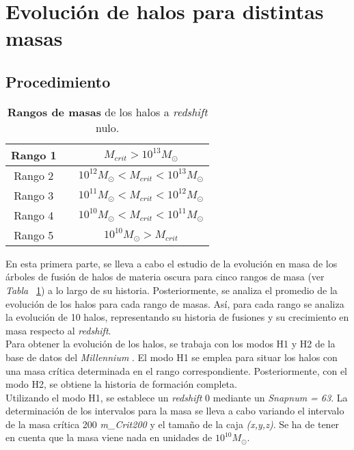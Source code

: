 \section{Evolución de halos para distintas masas} 
\label{sec:2} %

\subsection{Procedimiento}
\label{subsec:2_A}

\begin{table}[H]
\begin{center}
\begin{tabular}{ccc}
\toprule
\cellcolor[gray]{0.9}Rango 1 & & $M_{crit}>10^{13}M_\odot$ \\
\midrule
\cellcolor[gray]{0.9}Rango 2 & & $10^{12}M_\odot<M_{crit}<10^{13}M_\odot$ \\
\midrule
\cellcolor[gray]{0.9}Rango 3 & & $10^{11}M_\odot<M_{crit}<10^{12}M_\odot$ \\
\midrule
\cellcolor[gray]{0.9}Rango 4 & & $10^{10}M_\odot<M_{crit}<10^{11}M_\odot$ \\
\midrule
\cellcolor[gray]{0.9}Rango 5 & & $10^{10}M_\odot>M_{crit}$ \\
\bottomrule
\end{tabular}
\end{center}
\caption{\textbf{Rangos de masas} de los halos a \textit{redshift} nulo.}
\label{tab:tabla2}
\end{table}

En esta primera parte, se lleva a cabo el estudio de la evolución en masa de los árboles de fusión de halos de materia oscura para cinco rangos de masa (ver \textit{Tabla} ~\ref{tab:tabla2}) a lo largo de su historia. Posteriormente, se analiza el promedio de la evolución de los halos para cada rango de masas. Así, para cada rango se analiza la evolución de 10 halos, representando su historia de fusiones y su crecimiento en masa respecto al \textit{redshift}.   \\

Para obtener la evolución de los halos, se trabaja con los modos H1 y H2 de la base de datos del \textit{Millennium} \cite{6}. El modo H1 se emplea para situar los halos con una masa crítica determinada en el rango correspondiente. Posteriormente, con el modo H2, se obtiene la historia de formación completa. \\

Utilizando el modo H1, se establece un \textit{redshift} 0 mediante un \textit{Snapnum = 63}. La determinación de los intervalos para la masa se lleva a cabo variando el intervalo de la masa crítica 200 \textit{m_Crit200} y el tamaño de la caja \textit{(x,y,z)}. Se ha de tener en cuenta que la masa viene nada en unidades de $10^{10}M_\odot$. \\


